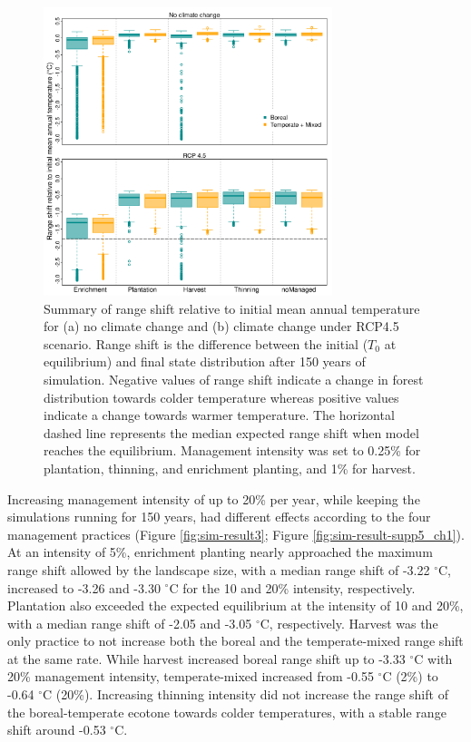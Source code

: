 \hypertarget{fig:sim-result2}{%
\begin{figure}
\centering
\includegraphics[width=0.75\textwidth,height=\textheight]{manuscript/img/sim-result_3.png}
\caption[{Summary of range shift relative to initial mean annual
temperature for (a) no climate change and (b) climate change under
RCP4.5 scenario.}]{Summary of range shift relative to initial mean
annual temperature for (a) no climate change and (b) climate change
under RCP4.5 scenario. Range shift is the difference between the initial
(\(T_0\) at equilibrium) and final state distribution after 150 years of
simulation. Negative values of range shift indicate a change in forest
distribution towards colder temperature whereas positive values indicate
a change towards warmer temperature. The horizontal dashed line
represents the median expected range shift when model reaches the
equilibrium. Management intensity was set to 0.25\% for plantation,
thinning, and enrichment planting, and 1\% for harvest.}
\label{fig:sim-result2}
\end{figure}
}

Increasing management intensity of up to 20\% per year, while keeping
the simulations running for 150 years, had different effects according
to the four management practices (Figure \ref{fig:sim-result3}; Figure
\ref{fig:sim-result-supp5_ch1}). At an intensity of 5\%, enrichment planting nearly approached the
maximum range shift allowed by the landscape size, with a median range
shift of -3.22 \(^{\circ}\)C, increased to -3.26 and -3.30 \(^{\circ}\)C
for the 10 and 20\% intensity, respectively. Plantation also exceeded
the expected equilibrium at the intensity of 10 and 20\%, with a median
range shift of -2.05 and -3.05 \(^{\circ}\)C, respectively. Harvest was
the only practice to not increase both the boreal and the
temperate-mixed range shift at the same rate. While harvest increased
boreal range shift up to -3.33 \(^{\circ}\)C with 20\% management
intensity, temperate-mixed increased from -0.55 \(^{\circ}\)C (2\%) to
-0.64 \(^{\circ}\)C (20\%). Increasing thinning intensity did not
increase the range shift of the boreal-temperate ecotone towards colder
temperatures, with a stable range shift around -0.53 \(^{\circ}\)C.\\

